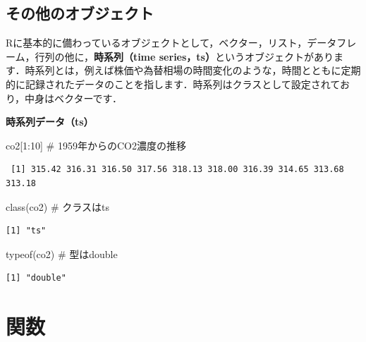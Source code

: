 \documentclass[
  letterpaper,
  DIV=11,
  numbers=noendperiod]{scrreprt}
\newenvironment{Shaded}{\begin{snugshade}}{\end{snugshade}}
\newcommand{\CommentTok}[1]{\textcolor[rgb]{0.37,0.37,0.37}{#1}}
\newcommand{\DecValTok}[1]{\textcolor[rgb]{0.68,0.00,0.00}{#1}}
\newcommand{\FunctionTok}[1]{\textcolor[rgb]{0.28,0.35,0.67}{#1}}
\newcommand{\NormalTok}[1]{\textcolor[rgb]{0.00,0.23,0.31}{#1}}
\newcommand{\SpecialCharTok}[1]{\textcolor[rgb]{0.37,0.37,0.37}{#1}}
\begin{document}
\hypertarget{ux305dux306eux4ed6ux306eux30aaux30d6ux30b8ux30a7ux30afux30c8}{%
\subsection{その他のオブジェクト}\label{ux305dux306eux4ed6ux306eux30aaux30d6ux30b8ux30a7ux30afux30c8}}

Rに基本的に備わっているオブジェクトとして，ベクター，リスト，データフレーム，行列の他に，\textbf{時系列（time
series，ts）}というオブジェクトがあります．時系列とは，例えば株価や為替相場の時間変化のような，時間とともに定期的に記録されたデータのことを指します．時系列はクラスとして設定されており，中身はベクターです．

\textbf{時系列データ（ts）}

\begin{Shaded}
\begin{Highlighting}[]
\NormalTok{co2[}\DecValTok{1}\SpecialCharTok{:}\DecValTok{10}\NormalTok{] }\CommentTok{\# 1959年からのCO2濃度の推移}
\end{Highlighting}
\end{Shaded}

\begin{verbatim}
 [1] 315.42 316.31 316.50 317.56 318.13 318.00 316.39 314.65 313.68 313.18
\end{verbatim}

\begin{Shaded}
\begin{Highlighting}[]
\FunctionTok{class}\NormalTok{(co2) }\CommentTok{\# クラスはts}
\end{Highlighting}
\end{Shaded}

\begin{verbatim}
[1] "ts"
\end{verbatim}

\begin{Shaded}
\begin{Highlighting}[]
\FunctionTok{typeof}\NormalTok{(co2) }\CommentTok{\# 型はdouble}
\end{Highlighting}
\end{Shaded}

\begin{verbatim}
[1] "double"
\end{verbatim}

\hypertarget{ux95a2ux6570}{%
\section{関数}\label{ux95a2ux6570}}
\end{document}
